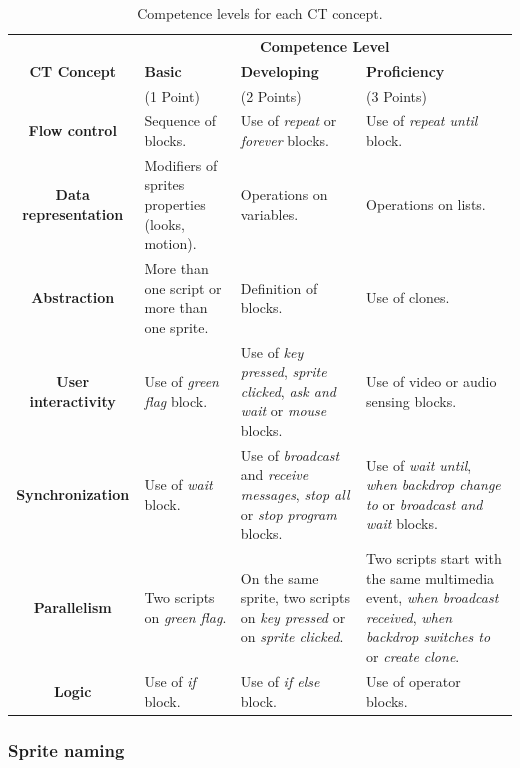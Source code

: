   \begin{table}
    \begin{center}
    \begin{tabular}{|c|p{3.5cm}|p{3.5cm}|p{3.5cm}|}
    \hline
     & \multicolumn{3}{|c|}{\textbf{Competence Level}} \\ \cline{2-4}
    \textbf{CT Concept} & \textbf{Basic} & \textbf{Developing} & \textbf{Proficiency} \\ 
    & (1 Point) & (2 Points) & (3 Points) \\ \hline  
    \textbf{Flow control} & Sequence of blocks. & Use of \textit{repeat} or \textit{forever} blocks. & Use of \textit{repeat until} block. \\ \hline
    \textbf{Data representation} & Modifiers of sprites properties (looks, motion). & Operations on variables. & Operations on lists. \\ \hline
    \textbf{Abstraction} & More than one script or more than one sprite. & Definition of blocks. & Use of clones. \\ \hline
    \textbf{User interactivity} & Use of \textit{green flag} block. & Use of \textit{key pressed}, \textit{sprite clicked}, \textit{ask and wait} or \textit{mouse} blocks. & Use of video or audio sensing blocks. \\ \hline
    \textbf{Synchronization} & Use of \textit{wait} block. & Use of \textit{broadcast} and \textit{receive messages}, \textit{stop all} or \textit{stop program} blocks. & Use of \textit{wait until}, \textit{when backdrop change to} or \textit{broadcast and wait} blocks. \\ \hline
    \textbf{Parallelism} & Two scripts on \textit{green flag}. & On the same sprite, two scripts on \textit{key pressed} or on \textit{sprite clicked}. & Two scripts start with the same multimedia event, \textit{when broadcast received}, \textit{when backdrop switches to} or \textit{create clone}. \\ \hline
    \textbf{Logic} & Use of \textit{if} block. & Use of \textit{if else} block. & Use of operator blocks. \\ \hline
  \end{tabular}
  \caption{Competence levels for each CT concept.}
  \label{table:competence_level}
 \end{center}
\end{table}

\subsubsection{Sprite naming}
\label{subsubsec:sprite_naming}

